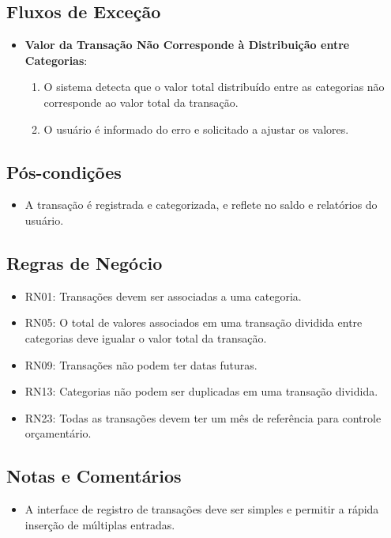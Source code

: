 \subsection*{Fluxos de Exceção}
\begin{addmargin}[1.5cm]{0cm}
	\begin{itemize}
		\item \textbf{Valor da Transação Não Corresponde à Distribuição entre Categorias}:
		      \begin{enumerate}
			      \item O sistema detecta que o valor total distribuído entre as categorias não corresponde ao valor total da transação.
			      \item O usuário é informado do erro e solicitado a ajustar os valores.
		      \end{enumerate}
	\end{itemize}
\end{addmargin}

\subsection*{Pós-condições}
\begin{addmargin}[1.5cm]{0cm}
	\begin{itemize}
		\item A transação é registrada e categorizada, e reflete no saldo e relatórios do usuário.
	\end{itemize}
\end{addmargin}

\subsection*{Regras de Negócio}
\begin{addmargin}[1.5cm]{0cm}
	\begin{itemize}
		\item RN01: Transações devem ser associadas a uma categoria.
		\item RN05: O total de valores associados em uma transação dividida entre categorias deve igualar o valor total da transação.
		\item RN09: Transações não podem ter datas futuras.
		\item RN13: Categorias não podem ser duplicadas em uma transação dividida.
		\item RN23: Todas as transações devem ter um mês de referência para controle orçamentário.
	\end{itemize}
\end{addmargin}

\subsection*{Notas e Comentários}
\begin{addmargin}[1.5cm]{0cm}
	\begin{itemize}
		\item A interface de registro de transações deve ser simples e permitir a rápida inserção de múltiplas entradas.
	\end{itemize}
\end{addmargin}